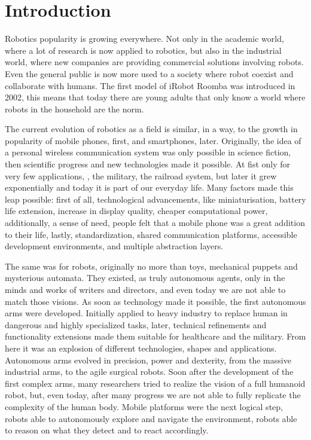 \chapter{Introduction}\label{ch:introduction}
Robotics popularity is growing everywhere. Not only in the academic world, where a lot of research is now applied to robotics, but also in the industrial world, where new companies are providing commercial solutions involving robots. Even the general public is now more used to a society where robot coexist and collaborate with humans. The first model of iRobot Roomba was introduced in 2002, this means that today there are young adults that only know a world where robots in the household are the norm.

The current evolution of robotics as a field is similar, in a way, to the growth in popularity of mobile phones, first, and smartphones, later.  Originally, the idea of a personal wireless communication system was only possible in science fiction, then scientific progress and new technologies made it possible. At fist only for very few applications, \ie, the military, the railroad system, but later it grew exponentially and today it is part of our everyday life. Many factors made this leap possible: first of all, technological advancements, like miniaturisation, battery life extension, increase in display quality, cheaper computational power, additionally, a sense of need, people felt that a mobile phone was a great addition to their life, lastly, standardization, shared communication platforms, accessible development environments, and multiple abstraction layers.

The same was for robots, originally no more than toys, mechanical puppets and mysterious automata. They existed, as truly autonomous agents, only in the minds and works of writers and directors, and even today we are not able to match those visions. As soon as technology made it possible, the first autonomous arms were developed. Initially applied to heavy industry to replace human in dangerous and highly specialized tasks, later, technical refinements and functionality extensions made them suitable for healthcare and the military. From here it was an explosion of different technologies, shapes and applications. Autonomous arms evolved in precision, power and dexterity,  from the massive industrial arms, to the agile surgical robots.  Soon after the development of the first complex arms, many researchers tried to realize the vision of a full humanoid robot, but, even today, after many progress we are not able to fully replicate the complexity of the human body. Mobile platforms were the next logical step, robots able to autonomously explore and navigate the environment, robots able to reason on what they detect and to react accordingly.

